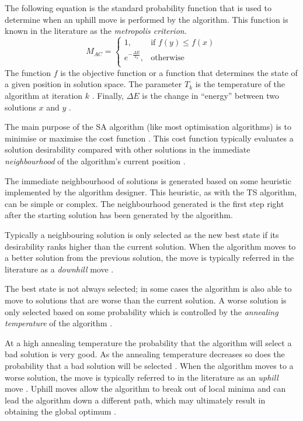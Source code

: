 The following equation is the standard probability function that is used to determine when an uphill move is performed by the algorithm. This function is known in the literature as the \emph{metropolis criterion}. 
\begin{equation}
\label{eq:saprobability}
	M_{AC} =
	\begin{cases}
	1, &\text{if $f(y) \leq f(x)$}\\
	e^{-\frac{\Delta E}{T_k}} , &\text{otherwise}\\
	\end{cases}
\end{equation}
The function $f$ is the objective function or a function that determines the state of a given position in solution space\cite{EcoEquilSA}. The parameter $T_k$ is the temperature of the algorithm at iteration $k$ \cite{EcoEquilSA}. Finally, $\Delta E$ is the change in ``energy'' between two solutions $x$ and $y$ \cite{EcoEquilSA}.

The main purpose of the SA algorithm (like most optimisation algorithms) is to minimise or maximise the cost function \cite{SASingleMultiObj}. This cost function typically evaluates a solution desirability compared with other solutions in the immediate \emph{neighbourhood} of the algorithm's current position \cite{TheoPraticalSA}. 

The immediate neighbourhood of solutions is generated based on some heuristic implemented by the algorithm designer\cite{AIModernApproach}. This heuristic, as with the TS algorithm, can be simple or complex. The neighbourhood generated is the first step right after the starting solution has been generated by the algorithm.

Typically a neighbouring solution is only selected as the new best state if its desirability ranks higher than the current solution. When the algorithm moves to a better solution from the previous solution, the move is typically referred in the literature as a \emph{downhill} move \cite{CurveFittingSA}.

The best state is not always selected; in some cases the algorithm is also able to move to solutions that are worse than the current solution. A worse solution is only selected based on some probability which is controlled by the \emph{annealing temperature} of the algorithm \cite{TheoPraticalSA}. 

At a high annealing temperature the probability that the algorithm will select a bad solution is very good. As the annealing temperature decreases so does the probability that a bad solution will be selected \cite{CurveFittingSA}. When the algorithm moves to a worse solution, the move is typically referred to in the literature as an \emph{uphill} move \cite{CurveFittingSA}. Uphill moves allow the algorithm to break out of local minima and can lead the algorithm down a different path, which may ultimately result in obtaining the global optimum \cite{SASingleMultiObj}. 


